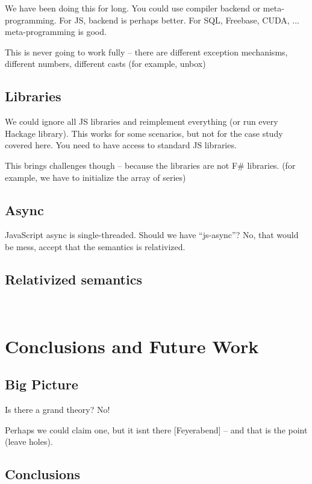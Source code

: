 \documentclass[submission,copyright,creativecommons]{eptcs}
\begin{document}
We have been doing this for long. You could use compiler backend or meta-programming.
For JS, backend is perhaps better. For SQL, Freebase, CUDA, ... meta-programming is good.

This is never going to work fully -- there are different exception mechanisms, different
numbers, different casts (for example, unbox)


\subsection{Libraries}
\label{sec:js-lib}

We could ignore all JS libraries and reimplement everything (or run every Hackage library).
This works for some scenarios, but not for the case study covered here.
You need to have access to standard JS libraries.

This brings challenges though -- because the libraries are not F\# libraries.
(for example, we have to initialize the array of series)

\subsection{Async}
\label{sec:js-async}

JavaScript async is single-threaded. Should we have ``js-async''? No, that would be mess,
accept that the semantics is relativized.

\subsection{Relativized semantics}
\label{sec:js-relative}

~

\section{Conclusions and Future Work}

\cite{websharper-piglets} \cite{websharper-guis}

\subsection{Big Picture}
Is there a grand theory? No!

Perhaps we could claim one, but it isnt there [Feyerabend] -- and that is the point 
(leave holes).

\subsection{Conclusions}


\nocite{*}


\end{document}
